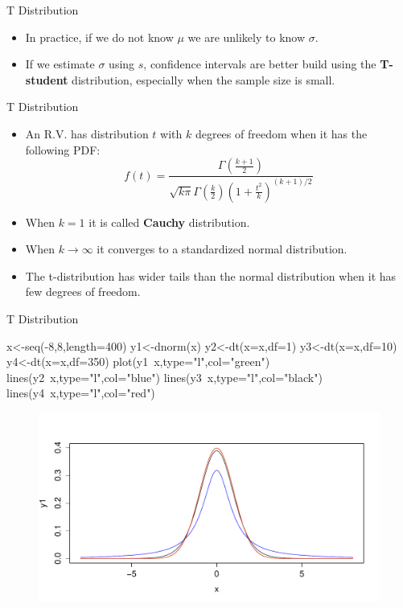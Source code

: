 \documentclass[handout]{beamer}
\begin{document}
\begin{frame}{T Distribution}
\scriptsize{
\begin{itemize}
 \item In practice, if we do not know $\mu$ we are unlikely to know $\sigma$.
 \item If we estimate $\sigma$ using $s$, confidence intervals are better build using the \textbf{T-student} distribution, especially when the sample size is small.
\end{itemize}

\begin{block}{T Distribution}
\begin{itemize}
 \item An R.V. has distribution $t$ with $k$ degrees of freedom when it has the following PDF:
\begin{displaymath}
 f(t)=\frac{\Gamma(\frac{k+1}{2})}{\sqrt{k\pi}\Gamma(\frac k2)(1+\frac{t^2}{k})^{(k+1)/2}}
\end{displaymath}
\item  When $k=1$ it is called \textbf{Cauchy} distribution.
\item When $k\rightarrow \infty$ it converges to a standardized normal distribution.
 \item The t-distribution has wider tails than the normal distribution when it has few degrees of freedom.


\end{itemize}

 
\end{block}




} 
\end{frame}

\begin{frame}[fragile]{T Distribution}
 \scriptsize{



\begin{verbatim*}
x<-seq(-8,8,length=400)
y1<-dnorm(x)
y2<-dt(x=x,df=1)
y3<-dt(x=x,df=10)
y4<-dt(x=x,df=350)
plot(y1~x,type="l",col="green")
lines(y2~x,type="l",col="blue")
lines(y3~x,type="l",col="black")
lines(y4~x,type="l",col="red")

\end{verbatim*}

 \begin{figure}[h!]
	\centering
	\includegraphics[scale=0.3]{pics/tstudent.pdf}
\end{figure}


}
\end{frame}
\end{document}
